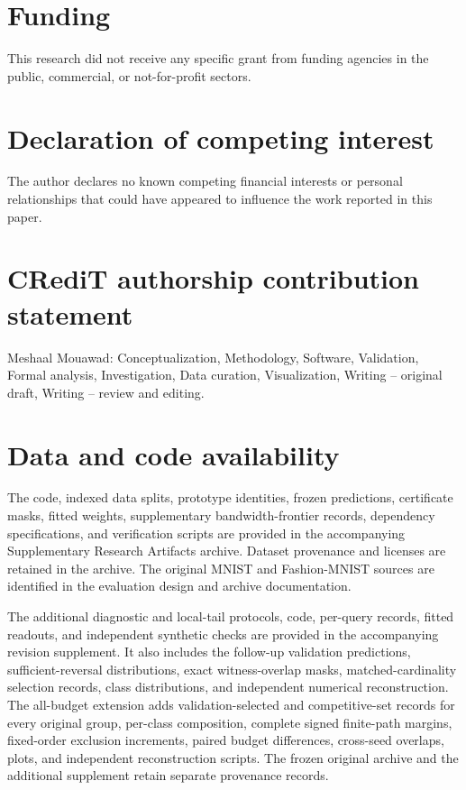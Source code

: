 \documentclass[preprint,12pt,authoryear]{elsarticle}
\begin{document}


\section*{Funding}
This research did not receive any specific grant from funding agencies in the public, commercial, or not-for-profit sectors.

\section*{Declaration of competing interest}
The author declares no known competing financial interests or personal relationships that could have appeared to influence the work reported in this paper.

\section*{CRediT authorship contribution statement}
Meshaal Mouawad: Conceptualization, Methodology, Software, Validation, Formal analysis, Investigation, Data curation, Visualization, Writing -- original draft, Writing -- review and editing.

\section*{Data and code availability}
The code, indexed data splits, prototype identities, frozen predictions, certificate masks, fitted weights, supplementary bandwidth-frontier records, dependency specifications, and verification scripts are provided in the accompanying Supplementary Research Artifacts archive. Dataset provenance and licenses are retained in the archive. The original MNIST and Fashion-MNIST sources are identified in the evaluation design and archive documentation.

The additional diagnostic and local-tail protocols, code, per-query records, fitted readouts, and independent synthetic checks are provided in the accompanying revision supplement. It also includes the follow-up validation predictions, sufficient-reversal distributions, exact witness-overlap masks, matched-cardinality selection records, class distributions, and independent numerical reconstruction. The all-budget extension adds validation-selected and competitive-set records for every original group, per-class composition, complete signed finite-path margins, fixed-order exclusion increments, paired budget differences, cross-seed overlaps, plots, and independent reconstruction scripts. The frozen original archive and the additional supplement retain separate provenance records.
\end{document}
